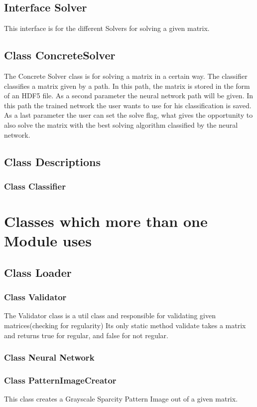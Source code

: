 \documentclass[parskip=full]{scrartcl}
\begin{document}
\subsection{Interface Solver}
This interface is for the different Solvers for solving a given matrix.
\subsection{Class ConcreteSolver}
The Concrete Solver class is for solving a matrix in a certain way.
The classifier classifies a matrix given by a path.
In this path, the matrix is stored in the form of an HDF5 file.
As a second parameter the neural network path will be given.
In this path the trained network the user wants to use for his classification is saved.
As a last parameter the user can set the solve flag, what gives the opportunity to also solve the matrix with the best solving algorithm classified by the neural network.

\subsection{Class Descriptions}

\subsubsection{Class Classifier}

\section{Classes which more than one Module uses}
\subsection{Class Loader}

\subsubsection{Class Validator}
The Validator class is a util class and responsible for validating given matrices(checking for regularity)
Its only static method validate takes a matrix and returns true for regular, and false for not regular.

\subsubsection{Class Neural Network}

\subsubsection{Class PatternImageCreator}
This class creates a Grayscale Sparcity Pattern Image out of a given matrix.
\end{document}

